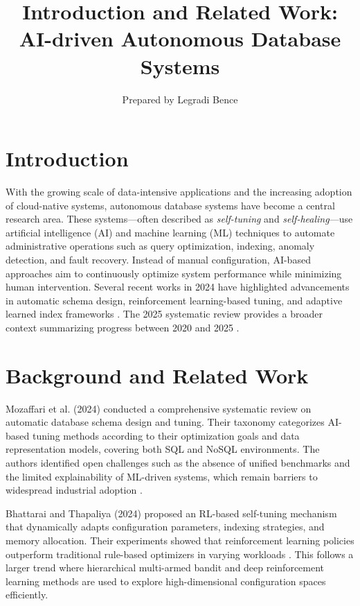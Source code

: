 \documentclass[sigconf]{acmart}
\title{Introduction and Related Work: AI-driven Autonomous Database Systems}
\author{Prepared by Legradi Bence}
\date{}
\begin{document}
\maketitle

\section*{Introduction}
With the growing scale of data-intensive applications and the increasing adoption of cloud-native systems, autonomous database systems have become a central research area. These systems—often described as \textit{self-tuning} and \textit{self-healing}—use artificial intelligence (AI) and machine learning (ML) techniques to automate administrative operations such as query optimization, indexing, anomaly detection, and fault recovery. Instead of manual configuration, AI-based approaches aim to continuously optimize system performance while minimizing human intervention. Several recent works in 2024 have highlighted advancements in automatic schema design, reinforcement learning-based tuning, and adaptive learned index frameworks \citep{mozaffari2024selftuning, bhattarai2024novel, rachapalli2024selfhealing, heidari2024uplif}. The 2025 systematic review provides a broader context summarizing progress between 2020 and 2025 \citep{nzenwata2025autonomous}.

\section*{Background and Related Work}
Mozaffari et al. (2024) conducted a comprehensive systematic review on automatic database schema design and tuning. Their taxonomy categorizes AI-based tuning methods according to their optimization goals and data representation models, covering both SQL and NoSQL environments. The authors identified open challenges such as the absence of unified benchmarks and the limited explainability of ML-driven systems, which remain barriers to widespread industrial adoption \citep{mozaffari2024selftuning}.

Bhattarai and Thapaliya (2024) proposed an RL-based self-tuning mechanism that dynamically adapts configuration parameters, indexing strategies, and memory allocation. Their experiments showed that reinforcement learning policies outperform traditional rule-based optimizers in varying workloads \citep{bhattarai2024novel}. This follows a larger trend where hierarchical multi-armed bandit and deep reinforcement learning methods are used to explore high-dimensional configuration spaces efficiently.
\end{document}
